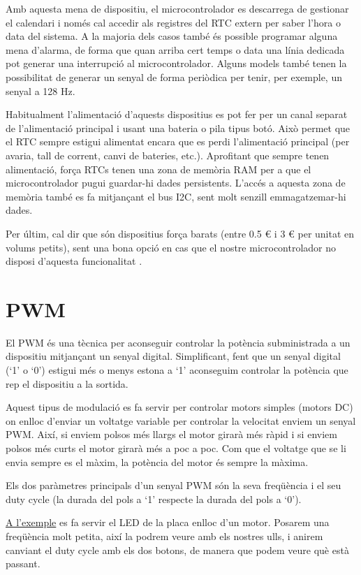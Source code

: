 Amb aquesta mena de dispositiu, el microcontrolador es descarrega de gestionar el calendari i només cal accedir als registres del RTC extern per saber l'hora o data del sistema. A la majoria dels casos també és possible programar alguna mena d'alarma, de forma que quan arriba cert temps o data una línia dedicada pot generar una interrupció al microcontrolador. Alguns models també tenen la possibilitat de generar un senyal de forma periòdica per tenir, per exemple, un senyal a 128 Hz.

Habitualment l'alimentació d'aquests dispositius es pot fer per un canal separat de l'alimentació principal i usant una bateria o pila tipus botó. Això permet que el RTC sempre estigui alimentat encara que es perdi l'alimentació principal (per avaria, tall de corrent, canvi de bateries, etc.). Aprofitant que sempre tenen alimentació, força RTCs tenen una zona de memòria RAM per a que el microcontrolador pugui guardar-hi dades persistents. L'accés a aquesta zona de memòria també es fa mitjançant el bus \gls{I2C}, sent molt senzill emmagatzemar-hi dades.

Per últim, cal dir que són dispositius força barats (entre 0.5 € i 3 € per unitat en volums petits), sent una bona opció en cas que el nostre microcontrolador no disposi d'aquesta funcionalitat \cite{RTCDS1}\cite{RTCDS2}\cite{RTCDS3}.

\chapter{PWM}
\label{sub:PWM}
El \gls{PWM} és una tècnica per aconseguir controlar la potència subministrada a un dispositiu mitjançant un senyal digital. Simplificant, fent que un senyal digital (‘1' o ‘0') estigui més o menys estona a ‘1' aconseguim controlar la potència que rep el dispositiu a la sortida.

Aquest tipus de modulació es fa servir per controlar motors simples (motors DC) on enlloc d'enviar un voltatge variable per controlar la velocitat enviem un senyal PWM. Així, si enviem polsos més llargs el motor girarà més ràpid i si enviem polsos més curts el motor girarà més a poc a poc. Com que el voltatge que se li envia sempre es el màxim, la potència del motor és sempre la màxima.

Els dos paràmetres principals d'un senyal PWM són la seva freqüència i el seu \gls{duty cycle} (la durada del pols a ‘1' respecte la durada del pols a ‘0').

\href{https://github.com/mariusmm/cursembedded/tree/master/Simplicity/PWM_1}{A l'exemple} es fa servir el LED de la placa enlloc d'un motor. Posarem una freqüència molt petita, així la podrem veure amb els nostres ulls, i anirem canviant el \gls{duty cycle} amb els dos botons, de manera que podem veure què està passant.

